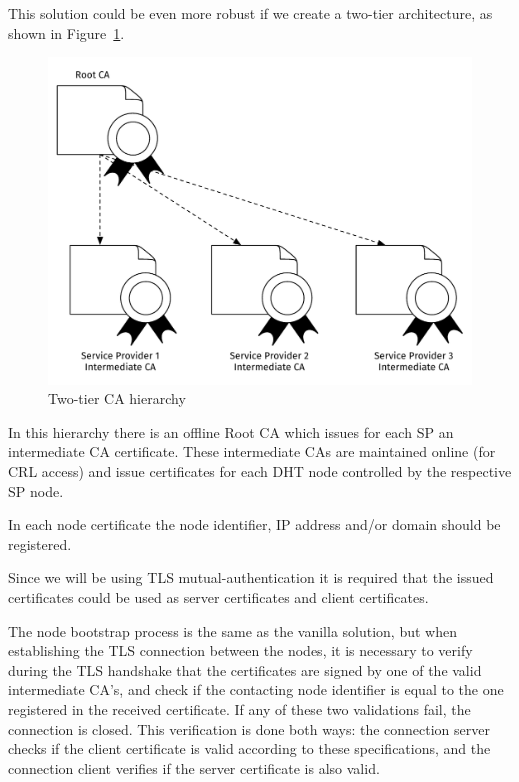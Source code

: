 This solution could be even more robust if we create a two-tier architecture, as shown in Figure~\ref{fig:ca-hierarchy}.

\begin{figure}[htb]
  \centering
  \includegraphics[scale=0.5]{Figures/architecture-ca-hierarchy.pdf}
  \caption{Two-tier \acl{CA} hierarchy}
\label{fig:ca-hierarchy}
\end{figure}

In this hierarchy there is an offline Root CA which issues for each \ac{SP} an intermediate CA certificate.
These intermediate CAs are maintained online (for \ac{CRL} access) and issue certificates for each DHT node controlled by the respective \ac{SP} node.

In each node certificate the node identifier, IP address and/or domain should be registered.

Since we will be using TLS mutual-authentication it is required that the issued certificates could be used as server certificates and client certificates.

The node bootstrap process is the same as the vanilla solution, but when establishing the TLS connection between the nodes, it is necessary to verify during the TLS handshake that the certificates are signed by one of the valid intermediate CA's, and check if the contacting node identifier is equal to the one registered in the received certificate.
If any of these two validations fail, the connection is closed.
This verification is done both ways: the connection server checks if the client certificate is valid according to these specifications, and the connection client verifies if the server certificate is also valid.

